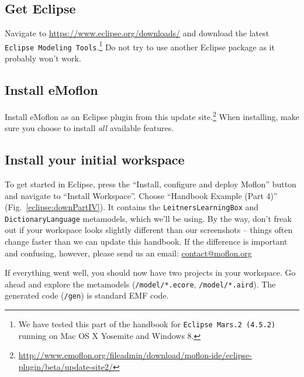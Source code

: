 
\subsection{Get Eclipse}
\label{sec:get-eclipse}

Navigate to \url{https://www.eclipse.org/downloads/} and download the latest \texttt{Eclipse Modeling Tools}.\footnote{We have tested this part of the handbook for \texttt{Eclipse Mars.2 (4.5.2)} running on Mac OS X Yosemite and Windows 8.}
Do not try to use another Eclipse package as it probably won't work.

\subsection{Install eMoflon}
\label{sec:get-emoflon}

Install eMoflon as an Eclipse plugin from this update site.\footnote{\url{http://www.emoflon.org/fileadmin/download/moflon-ide/eclipse-plugin/beta/update-site2/}}
When installing, make sure you choose to install \emph{all} available features.

\subsection{Install your initial workspace}
\label{sec:loadSourceMeta}

To get started in Eclipse, press the ``Install, configure and deploy Moflon'' button and navigate to ``Install Workspace''. 
Choose ``Handbook Example (Part 4)'' (Fig.~\ref{eclipse:downPartIV}). 
It contains the \texttt{Leitners\-Learning\-Box} and \texttt{Dictionary\-Language} metamodels, which we'll be using. 
By the way, don't freak out if your workspace looks slightly different than our screenshots -- things often change faster than we can update this handbook.
If the difference is important and confusing, however, please send us an email:  \url{contact@moflon.org}

If everything went well, you should now have two projects in your workspace.  
Go ahead and explore the metamodels (\texttt{/model/*.ecore}, \texttt{/model/*.aird}).
The generated code (\texttt{/gen}) is standard EMF code.

